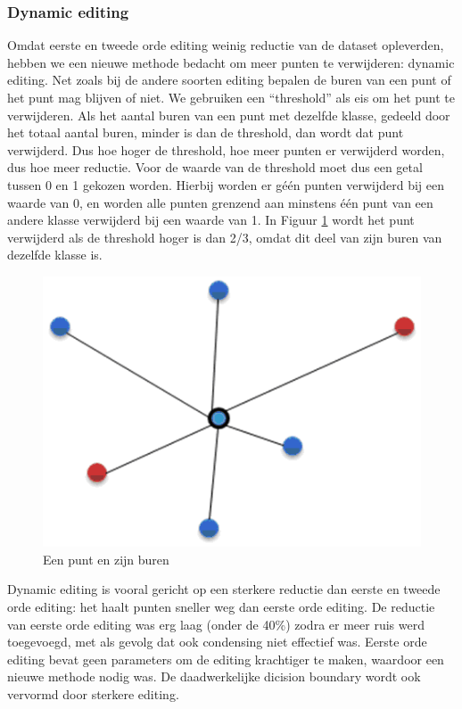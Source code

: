 \documentclass{article}
\begin{document}
\subsubsection{Dynamic editing}
Omdat eerste en tweede orde editing weinig reductie van de dataset opleverden, hebben we een nieuwe methode bedacht om meer punten te verwijderen: dynamic editing. Net zoals bij de andere soorten editing bepalen de buren van een punt of het punt mag blijven of niet. We gebruiken een ``threshold'' als eis om het punt te verwijderen. Als het aantal buren van een punt met dezelfde klasse, gedeeld door het totaal aantal buren, minder is dan de threshold, dan wordt dat punt verwijderd. Dus hoe hoger de threshold, hoe meer punten er verwijderd worden, dus hoe meer reductie. Voor de waarde van de threshold moet dus een getal tussen 0 en 1 gekozen worden. Hierbij worden er g\'e\'en punten verwijderd bij een waarde van 0, en worden alle punten grenzend aan minstens \'{e}\'{e}n punt van een andere klasse verwijderd bij een waarde van 1.  In Figuur \ref{buren} wordt het punt verwijderd als de threshold hoger is dan 2/3, omdat dit deel van zijn buren van dezelfde klasse is.
\clearpage

\begin{figure}[!h]
    \centering
        \includegraphics[scale=0.4, page=1]{buren}
	\caption{Een punt en zijn buren}
    \label{buren}
\end{figure}

Dynamic editing is vooral gericht op een sterkere reductie dan eerste en tweede orde editing: het haalt punten sneller weg dan eerste orde editing. De reductie van eerste orde editing was erg laag  (onder de 40\%) zodra er meer ruis werd toegevoegd, met als gevolg dat ook condensing niet effectief was. Eerste orde editing bevat geen parameters om de editing krachtiger te maken, waardoor een nieuwe methode nodig was. De daadwerkelijke dicision boundary wordt ook vervormd door sterkere editing.
\end{document}
